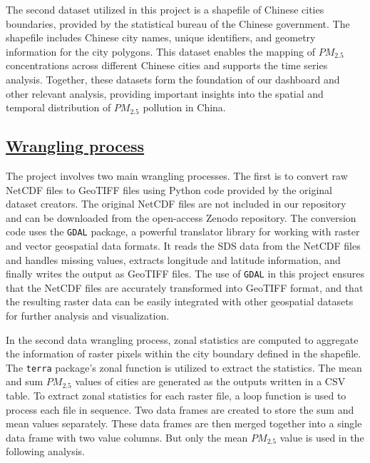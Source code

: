 \documentclass[
  12pt,
]{article}
\begin{document}
The second dataset utilized in this project is a shapefile of Chinese
cities boundaries, provided by the statistical bureau of the Chinese
government. The shapefile includes Chinese city names, unique
identifiers, and geometry information for the city polygons. This
dataset enables the mapping of \(PM_{2.5}\) concentrations across
different Chinese cities and supports the time series analysis.
Together, these datasets form the foundation of our dashboard and other
relevant analysis, providing important insights into the spatial and
temporal distribution of \(PM_{2.5}\) pollution in China.

\hypertarget{wrangling-process}{%
\subsection{\texorpdfstring{\href{https://github.com/Artemis20123/FangLiRenZhang_ENV872_EDA_FinalProject/blob/main/Code/data\%20wrangling.Rmd}{Wrangling
process}}{Wrangling process}}\label{wrangling-process}}

The project involves two main wrangling processes. The first is to
convert raw NetCDF files to GeoTIFF files using Python code provided by
the original dataset creators. The original NetCDF files are not
included in our repository and can be downloaded from the open-access
Zenodo repository. The conversion code uses the \texttt{GDAL} package, a
powerful translator library for working with raster and vector
geospatial data formats. It reads the SDS data from the NetCDF files and
handles missing values, extracts longitude and latitude information, and
finally writes the output as GeoTIFF files. The use of \texttt{GDAL} in
this project ensures that the NetCDF files are accurately transformed
into GeoTIFF format, and that the resulting raster data can be easily
integrated with other geospatial datasets for further analysis and
visualization.

In the second data wrangling process, zonal statistics are computed to
aggregate the information of raster pixels within the city boundary
defined in the shapefile. The \texttt{terra} package's zonal function is
utilized to extract the statistics. The mean and sum \(PM_{2.5}\) values
of cities are generated as the outputs written in a CSV table. To
extract zonal statistics for each raster file, a loop function is used
to process each file in sequence. Two data frames are created to store
the sum and mean values separately. These data frames are then merged
together into a single data frame with two value columns. But only the
mean \(PM_{2.5}\) value is used in the following analysis.
\end{document}
